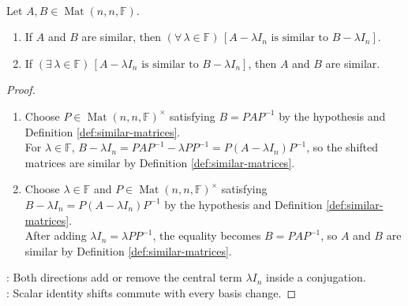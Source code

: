 \begin{theorem} \label{thm:similarity-preserves-scalar-shifts} \\
Let $A,B\in\operatorname{Mat}(n,n,\mathbb{F})$.
\begin{enumerate}[label=(\roman*)]
\setlength{\itemsep}{0pt}
\item If $A$ and $B$ are similar, then $(\forall\,\lambda\in\mathbb{F})\,[A-\lambda I_n\text{ is similar to }B-\lambda I_n]$.
\item If $(\exists\,\lambda\in\mathbb{F})\,[A-\lambda I_n\text{ is similar to }B-\lambda I_n]$, then $A$ and $B$ are similar.
\end{enumerate}
\begin{proof}
\begin{enumerate}[label=(\roman*)]
\setlength{\itemsep}{0pt}
\item Choose $P\in\operatorname{Mat}(n,n,\mathbb{F})^{\times}$ satisfying $B=PAP^{-1}$ by the hypothesis and Definition \ref{def:similar-matrices}.\\
For $\lambda\in\mathbb{F}$, $B-\lambda I_n=PAP^{-1}-\lambda PP^{-1}=P(A-\lambda I_n)P^{-1}$, so the shifted matrices are similar by Definition \ref{def:similar-matrices}.
\item Choose $\lambda\in\mathbb{F}$ and $P\in\operatorname{Mat}(n,n,\mathbb{F})^{\times}$ satisfying $B-\lambda I_n=P(A-\lambda I_n)P^{-1}$ by the hypothesis and Definition \ref{def:similar-matrices}.\\
After adding $\lambda I_n=\lambda PP^{-1}$, the equality becomes $B=PAP^{-1}$, so $A$ and $B$ are similar by Definition \ref{def:similar-matrices}.
\end{enumerate}
: Both directions add or remove the central term $\lambda I_n$ inside a conjugation.\\
: Scalar identity shifts commute with every basis change.
\end{proof}
\end{theorem}

